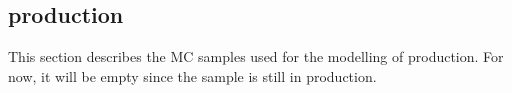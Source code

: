 \subsection[tgamma production]{\tgamma production}
\label{subsec:tgamma}

This section describes the MC samples used for the modelling of \tgamma production.
For now, it will be empty since the sample is still in production.
